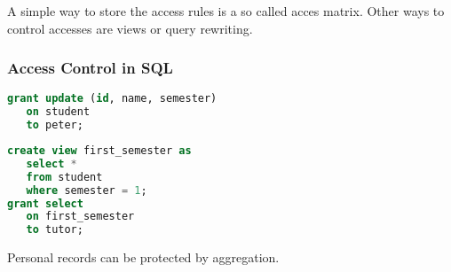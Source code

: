 A simple way to store the access rules is a so called acces matrix. Other ways to control accesses are views or query rewriting.




\subsubsection{Access Control in SQL}


\begin{lstlisting}[language=sql,morekeywords={to}]
grant update (id, name, semester)
   on student
   to peter;
\end{lstlisting}

\begin{lstlisting}[language=sql,morekeywords={to}]
create view first_semester as
   select *
   from student
   where semester = 1;
grant select
   on first_semester
   to tutor;
\end{lstlisting}

Personal records can be protected by aggregation.

\clearpage



